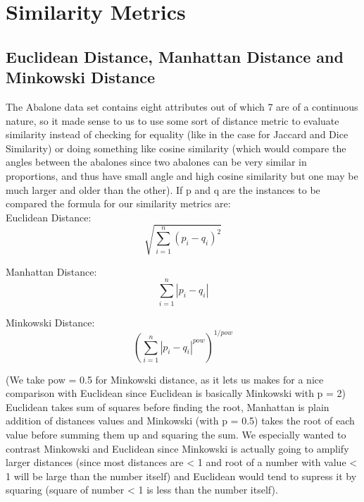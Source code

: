 \section{Similarity Metrics}

\subsection{Euclidean Distance, Manhattan Distance and Minkowski Distance}

The Abalone data set contains eight attributes out of which 7 are of a continuous nature, so it made sense to us to use some sort of distance metric to evaluate similarity instead of checking for equality (like in the case for Jaccard and Dice Similarity) or doing something like cosine similarity (which would compare the angles between the abalones since two abalones can be very similar in proportions, and thus have small angle and high cosine similarity but one may be much larger and older than the other). If p and q are the instances to be compared the formula for our similarity metrics are: \\

Euclidean Distance:
\begin{equation}
\sqrt{\sum_{i=1}^{n} (p_{i} - q_{i})^{2}}
\end{equation}

Manhattan Distance:
\begin{equation}
\sum_{i=1}^{n} |p_{i} - q_{i}|
\end{equation}

Minkowski Distance:
\begin{equation}
{(\sum_{i=1}^{n} {|p_{i} - q_{i}|}^{pow})}^{1/pow}
\end{equation}

(We take pow = 0.5 for Minkowski distance, as it lets us makes for a nice comparison with Euclidean since Euclidean is basically Minkowski with p = 2) \\

Euclidean takes sum of squares before finding the root, Manhattan is plain addition of distances values and Minkowski (with p = 0.5) takes the root of each value before summing them up and squaring the sum. We especially wanted to contrast Minkowski and Euclidean since Minkowski is actually going to amplify larger distances (since most distances are < 1 and root of a number with value < 1 will be large than the number itself) and Euclidean would tend to supress it by squaring (square of number < 1 is less than the number itself). 


